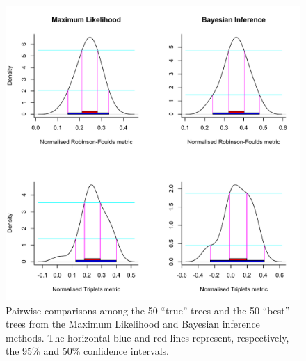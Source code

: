 \begin{figure}%
\centering
    \includegraphics[width=1\textwidth]{Supplementaries/Figures/TEM/True_vs_Best_trees.pdf}
    \caption{Pairwise comparisons among the 50 ``true'' trees and the 50 ``best'' trees from the Maximum Likelihood and Bayesian inference methods. The horizontal blue and red lines represent, respectively, the 95\% and 50\% confidence intervals.} 
\label{Fig_Supp_True_Best} 
\end{figure}

